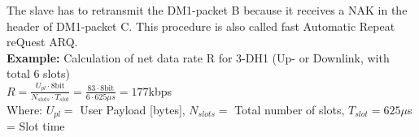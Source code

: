 	The slave has to retransmit the DM1-packet B because it receives a NAK in the header 
	of DM1-packet C. This procedure is also called fast Automatic Repeat reQuest ARQ. \\
	
	\textbf{Example:} Calculation of net data rate R for 3-DH1 (Up- or Downlink, with total 6 slots) \\
	$R = \frac{U_{pl}\cdot 8 \text{bit}}{N_{slots}\cdot T_{slot}} = \frac{83\cdot 8 \text{bit}}{6\cdot 625\mu s} = 177$kbps \\
	Where: $U_{pl}=$ User Payload [bytes], $N_{slots}=$ Total number of slots, $T_{slot}=625\mu$s = Slot time
	
	
	